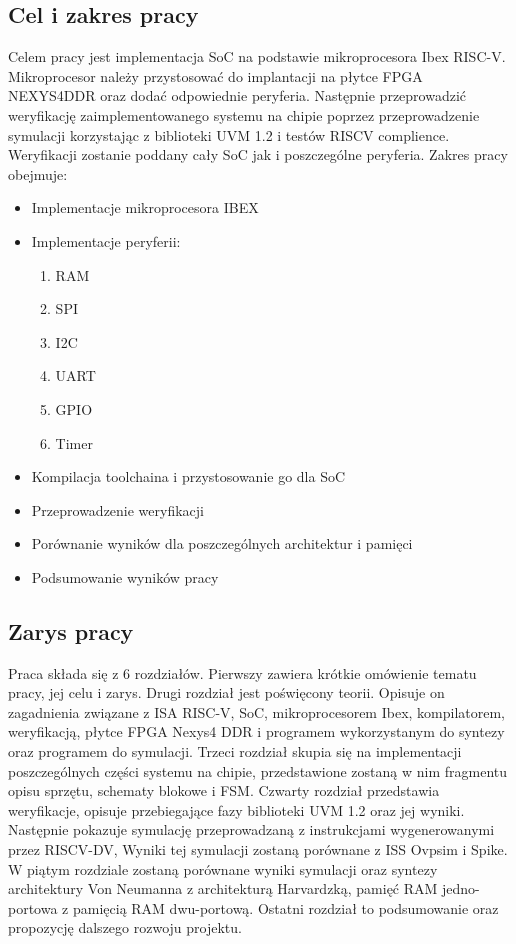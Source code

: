 \documentclass[11pt,a4paper]{article}
\begin{document}
	\subsection{Cel i zakres pracy}
	\hspace{5mm}
	Celem pracy jest implementacja SoC na podstawie mikroprocesora Ibex RISC-V. Mikroprocesor należy przystosować do implantacji na płytce FPGA NEXYS4DDR oraz dodać odpowiednie peryferia. Następnie przeprowadzić weryfikację zaimplementowanego systemu na chipie poprzez przeprowadzenie symulacji korzystając z biblioteki UVM 1.2 i testów RISCV complience. Weryfikacji zostanie poddany cały SoC jak i poszczególne peryferia.\newline
	Zakres pracy obejmuje:
	\begin{itemize}
	  \item Implementacje mikroprocesora IBEX
	  \item Implementacje peryferii:
	  \begin{enumerate}
	  	\item RAM
	  	\item SPI
	  	\item I2C
	  	\item UART
	  	\item GPIO
	  	\item Timer
	  \end{enumerate}
	  \item Kompilacja toolchaina i przystosowanie go dla SoC
	  \item Przeprowadzenie weryfikacji
  	  \item Porównanie wyników dla poszczególnych architektur i pamięci
  	  \item Podsumowanie wyników pracy
	\end{itemize}

	\subsection{Zarys pracy}
	\hspace{5mm}
	Praca składa się z 6 rozdziałów. Pierwszy zawiera krótkie omówienie tematu pracy, jej celu i zarys. Drugi rozdział jest poświęcony teorii. Opisuje on zagadnienia związane z ISA RISC-V, SoC, mikroprocesorem Ibex, kompilatorem, weryfikacją, płytce FPGA Nexys4 DDR i programem wykorzystanym do syntezy oraz programem do symulacji. Trzeci rozdział skupia się na implementacji poszczególnych części systemu na chipie, przedstawione zostaną w nim fragmentu opisu sprzętu, schematy blokowe i FSM. Czwarty rozdział przedstawia weryfikacje, opisuje przebiegające fazy biblioteki UVM 1.2 oraz jej wyniki. Następnie pokazuje symulację przeprowadzaną z instrukcjami wygenerowanymi przez RISCV-DV, Wyniki tej symulacji zostaną porównane z ISS Ovpsim i Spike. W piątym rozdziale zostaną porównane wyniki symulacji oraz syntezy architektury Von Neumanna z architekturą Harvardzką, pamięć RAM jedno-portowa z pamięcią RAM dwu-portową. Ostatni rozdział to podsumowanie oraz propozycję dalszego rozwoju projektu.
\newpage
	
\end{document}
